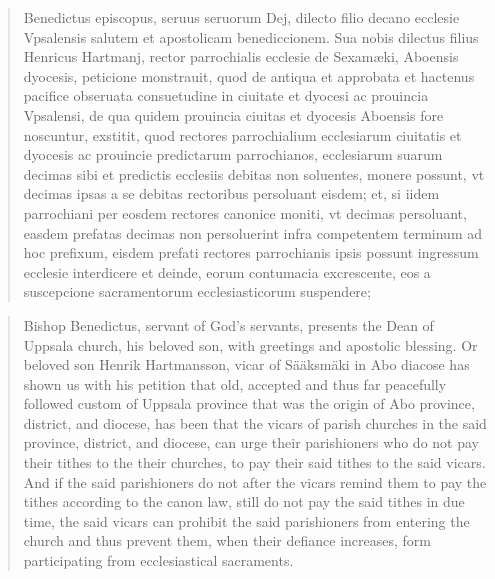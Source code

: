 \documentclass[a4paper]{article}
\begin{document}
\begin{quote}
  Benedictus episcopus, seruus seruorum Dej, dilecto filio decano
  ecclesie Vpsalensis salutem et apostolicam benediccionem. Sua nobis
  dilectus filius Henricus Hartmanj, rector parrochialis ecclesie de
  Sexamæki, Aboensis dyocesis, peticione monstrauit, quod de antiqua
  et approbata et hactenus pacifice obseruata consuetudine in ciuitate
  et dyocesi ac prouincia Vpsalensi, de qua quidem prouincia ciuitas
  et dyocesis Aboensis fore noscuntur, exstitit, quod rectores
  parrochialium ecclesiarum ciuitatis et dyocesis ac prouincie
  predictarum parrochianos, ecclesiarum suarum decimas sibi et
  predictis ecclesiis debitas non soluentes, monere possunt, vt
  decimas ipsas a se debitas rectoribus persoluant eisdem; et, si
  iidem parrochiani per eosdem rectores canonice moniti, vt decimas
  persoluant, easdem prefatas decimas non persoluerint infra
  competentem terminum ad hoc prefixum, eisdem prefati rectores
  parrochianis ipsis possunt ingressum ecclesie interdicere et deinde,
  eorum contumacia excrescente, eos a suscepcione sacramentorum
  ecclesiasticorum suspendere;
\end{quote}

\begin{quote}
  Bishop Benedictus, servant of God's servants, presents the Dean of
  Uppsala church, his beloved son, with greetings and apostolic
  blessing. Or beloved son Henrik Hartmansson, vicar of Sääksmäki in
  Abo diacose has shown us with his petition that old, accepted and
  thus far peacefully followed custom of Uppsala province that was the
  origin of Abo province, district, and diocese, has been that the
  vicars of parish churches in the said province, district, and
  diocese, can urge their parishioners who do not pay their tithes to
  the their churches, to pay their said tithes to the said vicars. And
  if the said parishioners do not after the vicars remind them to pay
  the tithes according to the canon law, still do not pay the said
  tithes in due time, the said vicars can prohibit the said
  parishioners from entering the church and thus prevent them, when
  their defiance increases, form participating from ecclesiastical
  sacraments.
\end{quote}
\end{document}
